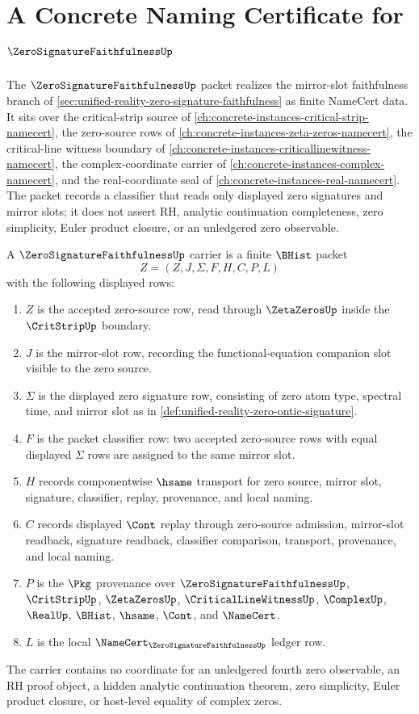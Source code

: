 \chapter{A Concrete Naming Certificate for $\ZeroSignatureFaithfulnessUp$}
\label{ch:concrete-instances-zero-signature-faithfulness-namecert}

The $\ZeroSignatureFaithfulnessUp$ packet realizes the mirror-slot faithfulness branch of \autoref{sec:unified-reality-zero-signature-faithfulness} as finite NameCert data. It sits over the critical-strip source of \autoref{ch:concrete-instances-critical-strip-namecert}, the zero-source rows of \autoref{ch:concrete-instances-zeta-zeros-namecert}, the critical-line witness boundary of \autoref{ch:concrete-instances-criticallinewitness-namecert}, the complex-coordinate carrier of \autoref{ch:concrete-instances-complex-namecert}, and the real-coordinate seal of \autoref{ch:concrete-instances-real-namecert}. The packet records a classifier that reads only displayed zero signatures and mirror slots; it does not assert RH, analytic continuation completeness, zero simplicity, Euler product closure, or an unledgered zero observable.

\begin{definition}
\label{def:zero-signature-faithfulness-carrier}
A $\ZeroSignatureFaithfulnessUp$ carrier is a finite $\BHist$ packet
$$
Z=(Z,J,\Sigma,F,H,C,P,L)
$$
with the following displayed rows:
\begin{enumerate}
\item $Z$ is the accepted zero-source row, read through $\ZetaZerosUp$ inside the $\CritStripUp$ boundary.
\item $J$ is the mirror-slot row, recording the functional-equation companion slot visible to the zero source.
\item $\Sigma$ is the displayed zero signature row, consisting of zero atom type, spectral time, and mirror slot as in \autoref{def:unified-reality-zero-ontic-signature}.
\item $F$ is the packet classifier row: two accepted zero-source rows with equal displayed $\Sigma$ rows are assigned to the same mirror slot.
\item $H$ records componentwise $\hsame$ transport for zero source, mirror slot, signature, classifier, replay, provenance, and local naming.
\item $C$ records displayed $\Cont$ replay through zero-source admission, mirror-slot readback, signature readback, classifier comparison, transport, provenance, and local naming.
\item $P$ is the $\Pkg$ provenance over $\ZeroSignatureFaithfulnessUp$, $\CritStripUp$, $\ZetaZerosUp$, $\CriticalLineWitnessUp$, $\ComplexUp$, $\RealUp$, $\BHist$, $\hsame$, $\Cont$, and $\NameCert$.
\item $L$ is the local $\NameCert_{\ZeroSignatureFaithfulnessUp}$ ledger row.
\end{enumerate}
The carrier contains no coordinate for an unledgered fourth zero observable, an RH proof object, a hidden analytic continuation theorem, zero simplicity, Euler product closure, or host-level equality of complex zeros.
\end{definition}

